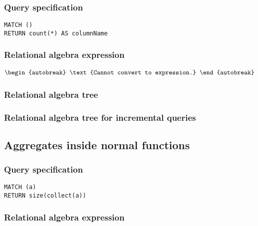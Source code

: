 \subsubsection*{Query specification}

\begin{lstlisting}
MATCH ()
RETURN count(*) AS columnName
\end{lstlisting}

\subsubsection*{Relational algebra expression}

\begin{align*}
\begin{autobreak}
\text{Cannot convert to expression.}
\end{autobreak}
\end{align*}

\subsubsection*{Relational algebra tree}


\subsubsection*{Relational algebra tree for incremental queries}


\subsection{Aggregates inside normal functions}

\subsubsection*{Query specification}

\begin{lstlisting}
MATCH (a)
RETURN size(collect(a))
\end{lstlisting}

\subsubsection*{Relational algebra expression}


